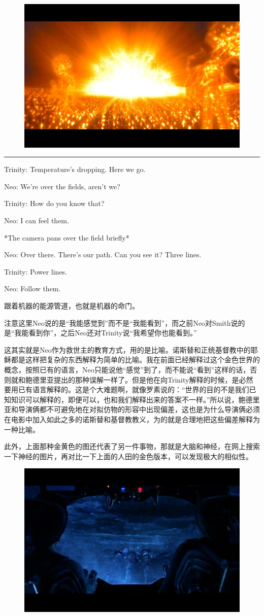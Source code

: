 \documentclass[UTF8]{ctexart}
\newcommand{\myparsep}{\noindent \rule[0.5ex]{\linewidth}{1pt}}
\newenvironment{myquote}{\color{green} \setlength{\leftskip}{6em} \setlength{\rightskip}{4em} \setlength{\parindent}{-2em}}{\par}
\begin{document}
\begin{figure}[htb]
\centering
\includegraphics[width=0.5\linewidth]{fig/3829d013f5b15e025aaf53c0.jpg}
\end{figure}

\myparsep

\begin{myquote}
Trinity: Temperature's dropping. Here we go.

Neo: We're over the fields, aren't we?

Trinity: How do you know that?

Neo: I can feel them.

*The camera pans over the field briefly*

Neo: Over there. There's our path. Can you see it? Three lines.

Trinity: Power lines.

Neo: Follow them.
\end{myquote}

跟着机器的能源管道，也就是机器的命门。

注意这里Neo说的是“我能感觉到”而不是“我能看到”，而之前Neo对Smith说的是“我能看到你”，之后Neo还对Trinity说“我希望你也能看到。”

这其实就是Neo作为救世主的教育方式，用的是比喻。诺斯替和正统基督教中的耶稣都是这样把复杂的东西解释为简单的比喻。我在前面已经解释过这个金色世界的概念，按照已有的语言，Neo只能说他“感觉”到了，而不能说“看到”这样的话，否则就和鲍德里亚提出的那种误解一样了。但是他在向Trinity解释的时候，是必然要用已有语言解释的。这是个大难题啊，就像罗素说的：“世界的目的不是我们已知知识可以解释的，即便可以，也和我们解释出来的答案不一样。”所以说，鲍德里亚和导演俩都不可避免地在对拟仿物的形容中出现偏差，这也是为什么导演俩必须在电影中加入如此之多的诺斯替和基督教教义，为的就是合理地把这些偏差解释为一种比喻。

此外，上面那种金黄色的图还代表了另一件事物，那就是大脑和神经，在网上搜索一下神经的图片，再对比一下上面的人田的金色版本，可以发现极大的相似性。

\begin{figure}[htb]
\centering
\includegraphics[width=0.5\linewidth]{fig/759c9825a282ac6035a80f72.jpg}
\end{figure}
\end{document}
